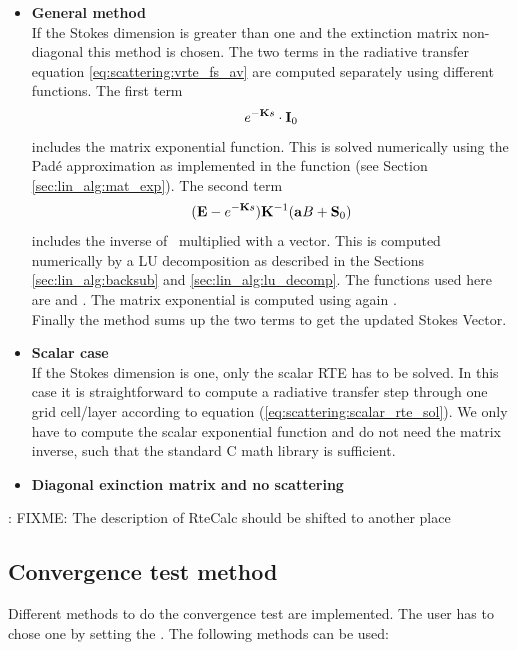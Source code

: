 \begin{itemize}
\item {\bf General method}\\
  If the Stokes dimension is greater than one and the extinction
  matrix non-diagonal this method is chosen.  The two terms in the
  radiative transfer equation \ref{eq:scattering:vrte_fs_av} are
  computed separately using different functions. The first term
\begin{equation}
 e^{-{\bf K} s}\cdot{\bf I}_0
\end{equation}
includes the matrix exponential function. This is solved numerically
using the Pad\'e approximation as implemented in the function
 (see Section \ref{sec:lin_alg:mat_exp}).  The
second term
\begin{equation}
({\bf E} - e^{-{\bf K}
    s}) {\bf K}^{-1} ({\bf a} B + {\bf S}_0)
\end{equation}
includes the inverse of \ExtMat\ multiplied with a vector. This is
computed numerically by a LU decomposition as described in the
Sections \ref{sec:lin_alg:backsub} and \ref{sec:lin_alg:lu_decomp}.
The functions used here are  and
. The matrix exponential is
computed using again .\\
Finally the method sums up the two terms to get the updated Stokes
Vector.
 
\item {\bf Scalar case}\\
  If the Stokes dimension is one, only the scalar RTE has to be
  solved.  In this case it is straightforward to compute a radiative
  transfer step through one grid cell/layer according to equation
  (\ref{eq:scattering:scalar_rte_sol}). We only have to compute the
  scalar exponential function and do not need the matrix inverse, such
  that the standard C math library is sufficient.

  
\item{\bf Diagonal exinction matrix and no scattering}
\end{itemize}
{\Large: FIXME: The description of RteCalc should be shifted to
  another place}


\subsection{Convergence test method}
\label{sec:scattering:conv_method}

Different methods to do the convergence test are implemented. The user
has to chose one by setting the .
The following methods can be used:

